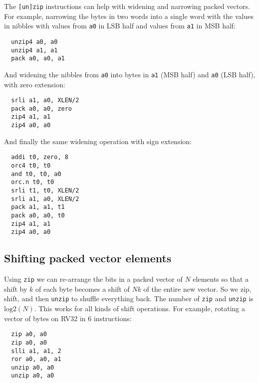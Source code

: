 The {\tt [un]zip} instructions can help with widening and narrowing packed
vectors. For example, narrowing the bytes in two words into a single
word with the values in nibbles with values from {\tt a0} in LSB half and
values from {\tt a1} in MSB half:

\begin{minipage}{\linewidth}
\begin{verbatim}
  unzip4 a0, a0
  unzip4 a1, a1
  pack a0, a0, a1
\end{verbatim}
\end{minipage}

And widening the nibbles from {\tt a0} into bytes in {\tt a1} (MSB half)
and {\tt a0} (LSB half), with zero extension:

\begin{minipage}{\linewidth}
\begin{verbatim}
  srli a1, a0, XLEN/2
  pack a0, a0, zero
  zip4 a1, a1
  zip4 a0, a0
\end{verbatim}
\end{minipage}

And finally the same widening operation with sign extension:

\begin{minipage}{\linewidth}
\begin{verbatim}
  addi t0, zero, 8
  orc4 t0, t0
  and t0, t0, a0
  orc.n t0, t0
  srli t1, t0, XLEN/2
  srli a1, a0, XLEN/2
  pack a1, a1, t1
  pack a0, a0, t0
  zip4 a1, a1
  zip4 a0, a0
\end{verbatim}
\end{minipage}


\subsection{Shifting packed vector elements}

Using {\tt zip} we can re-arrange the bits in a packed vector of $N$ elements
so that a shift by $k$ of each byte becomes a shift of $Nk$ of the entire new
vector. So we zip, shift, and then {\tt unzip} to shuffle everything back. The number
of {\tt zip} and {\tt unzip} is $\textrm{log}2(N)$. This works for all kinds of
shift operations. For example, rotating a vector of bytes on RV32 in 6
instructions:

\begin{minipage}{\linewidth}
\begin{verbatim}
  zip a0, a0
  zip a0, a0
  slli a1, a1, 2
  ror a0, a0, a1
  unzip a0, a0
  unzip a0, a0
\end{verbatim}
\end{minipage}

